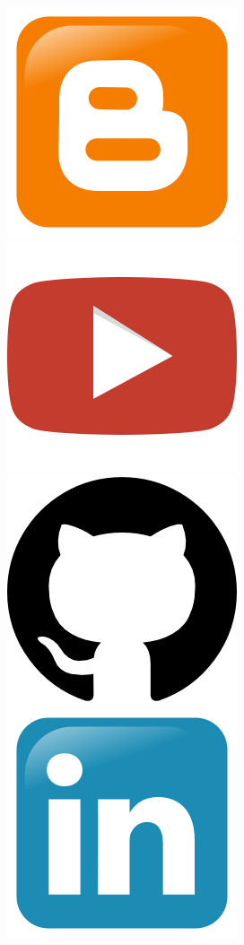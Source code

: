 \href{https://labdls.blogspot.mx}{\includegraphics[scale=0.1]{src/blogger_logo.png}}
\href{https://www.youtube.com/user/lab2dls}{\includegraphics[scale=0.1]{src/youtube_logo.png}}
\href{https://github.com/JorgeDeLosSantos}{\includegraphics[scale=0.08]{src/github_logo.png}}
\href{https://www.linkedin.com/in/pjdlsl}{\includegraphics[scale=0.1]{src/linkedin_logo.png}}
